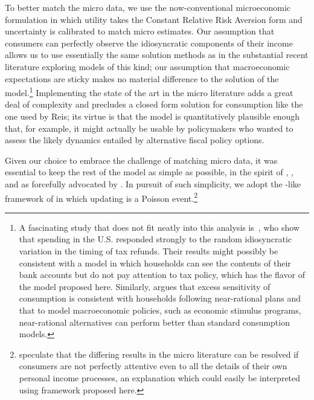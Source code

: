 \documentclass[titlepage]{\econtex}\newcommand{\texname}{cAndCwithStickyE}
\begin{document}
To better match the micro data, we use the now-conventional microeconomic formulation in which utility takes the Constant Relative Risk Aversion form and uncertainty is calibrated to match micro estimates.  Our assumption that consumers can perfectly observe the idiosyncratic components of their income allows us to use essentially the same solution methods as in the substantial recent literature exploring models of this kind; our assumption that macroeconomic expectations are sticky makes no material difference to the solution of the model.\footnote{A fascinating study that does not fit neatly into this analysis is~\cite{jpsTax}, who show that spending in the U.S.  responded strongly to the random idiosyncratic variation in the timing of tax refunds.  Their results might possibly be consistent with a model in which households can see the contents of their bank accounts but do not pay attention to tax policy, which has the flavor of the model proposed here. Similarly, \cite{Kueng:Near-rationality} argues that excess sensitivity of consumption is consistent with households following near-rational plans and that to model macroeconomic policies, such as economic stimulus programs, near-rational alternatives can perform better than standard consumption models.
}  Implementing the state of the art in the micro literature adds a great deal of complexity and precludes a closed form solution for consumption like the one used by Reis; its virtue is that the model is quantitatively plausible enough that, for example, it might actually be usable by policymakers who wanted to assess the likely dynamics entailed by alternative fiscal policy options.

Given our choice to embrace the challenge of matching micro data, it was essential to keep the rest of the model as simple as possible, in the spirit of \cite{ayNearRational}, \cite{cochrane:nearrational}, \cite{mrSlumps} and as forcefully advocated by \cite{browning&crossley:lifecycle}. In pursuit of such simplicity, we adopt the  \cite{calvoPrices}-like framework of \cite{carroll:epidemicinflQJE} in which updating is a Poisson event.\footnote{\cite{BrowningColladoAER} speculate that the differing results in the micro literature can be resolved if consumers are not perfectly attentive even to all the details of their own personal income processes, an explanation which could easily be interpreted using framework proposed here.}
\end{document}
